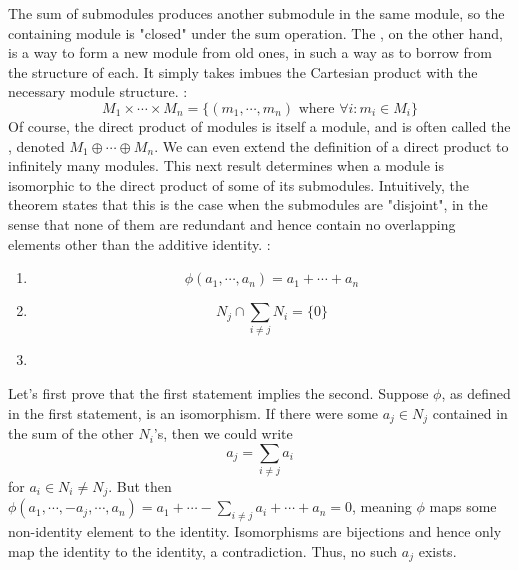 \documentclass{article}
\begin{document}
The sum of submodules produces another submodule in the same module, so the containing module is "closed" under the sum operation. The , on the other hand, is a way to form a new module from old ones, in such a way as to borrow from the structure of each. It simply takes imbues the Cartesian product with the necessary module structure.
\nn
{}: 
$$ M_1 \times \cdots \times M_n = \{ (m_1, \cdots, m_n) \text{ where } \forall i: m_i \in M_i \} $$
\indent {}
\nn
Of course, the direct product of modules is itself a module, and is often called the , denoted $ M_1 \oplus \cdots \oplus M_n $. We can even extend the definition of a direct product to infinitely many modules. This next result determines when a module is isomorphic to the direct product of some of its submodules. Intuitively, the theorem states that this is the case when the submodules are "disjoint", in the sense that none of them are redundant and hence contain no overlapping elements other than the additive identity.
\nn
{}: 
\begin{enumerate}
    \item {}
        $$ \phi(a_1, \cdots, a_n) = a_1 + \cdots + a_n $$
    \item {}
        $$ N_j \cap \sum_{i \neq j} N_i = \{ 0 \} $$
    \item {}
\end{enumerate}
\Pf Let's first prove that the first statement implies the second. Suppose $ \phi $, as defined in the first statement, is an isomorphism. If there were some $ a_j \in N_j $ contained in the sum of the other $ N_i $'s, then we could write
$$ a_j = \sum_{i \neq j} a_i $$
for $ a_i \in N_i \neq N_j $. But then $ \phi(a_1, \cdots, - a_j, \cdots, a_n) = a_1 + \cdots - \sum_{i \neq j} a_i + \cdots + a_n = 0 $, meaning $ \phi $ maps some non-identity element to the identity. Isomorphisms are bijections and hence only map the identity to the identity, a contradiction. Thus, no such $ a_j $ exists.
\end{document}
